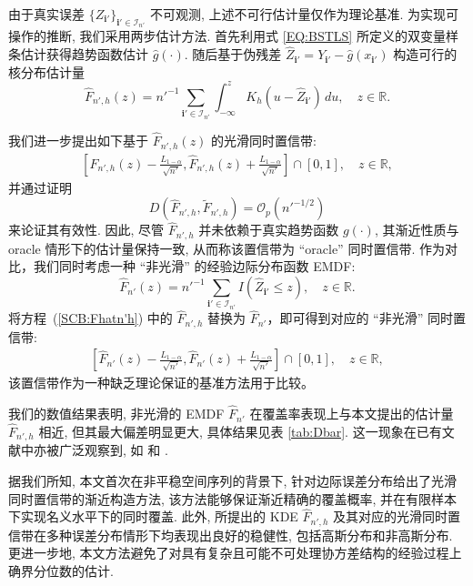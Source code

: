 \documentclass[a4paper,openay,14pt]{ctexbook}
\numberwithin{equation}{section}
\numberwithin{lem}{section}
\begin{document}
由于真实误差 $\{Z_{\mathbf{i}'}\}_{\mathbf{i}' \in \mathcal{I}_{n'}}$ 不可观测, 上述不可行估计量仅作为理论基准. 为实现可操作的推断, 我们采用两步估计方法. 首先利用式 \eqref{EQ:BSTLS} 所定义的双变量样条估计获得趋势函数估计 $\hat{g}(\cdot)$. 随后基于伪残差
$\hat{Z}_{\mathbf{i}'} = Y_{\mathbf{i}'} - \hat{g}(x_{\mathbf{i}'})$
构造可行的核分布估计量
\begin{equation}\label{EQ:Fn'hhat}
\hat{F}_{n',h}(z)
= n'^{-1} \sum_{\mathbf{i}' \in \mathcal{I}_{n'}}
\int_{-\infty}^{z} K_h(u - \hat{Z}_{\mathbf{i}'}) \, du,
\quad z \in \mathbb{R}.
\end{equation}

我们进一步提出如下基于 $\hat{F}_{n',h}(z)$ 的光滑同时置信带:
\begin{align}\label{SCB:Fhatn'h}
\left[
\hat{F}_{n',h}(z) - \frac{L_{1-\alpha}}{\sqrt{n'}},
\hat{F}_{n',h}(z) + \frac{L_{1-\alpha}}{\sqrt{n'}}
\right] \cap [0,1], 
\quad z \in \mathbb{R},
\end{align}
并通过证明
\[
D\left(\hat{F}_{n',h}, \tilde{F}_{n',h}\right)
= \mathcal{O}_p(n'^{-1/2})
\]
来论证其有效性. 因此, 尽管 $\hat{F}_{n',h}$ 并未依赖于真实趋势函数 $g(\cdot)$, 其渐近性质与 oracle 情形下的估计量保持一致, 从而称该置信带为 ``oracle'' 同时置信带.
作为对比，我们同时考虑一种 ``非光滑'' 的经验边际分布函数 EMDF:
\begin{equation} \label{EQ:Fn'hat}
    \hat{F}_{n'}(z) = n'^{-1}\sum_{\mathbf{i}'\in\mathcal{I}_{n'}} I(\hat{Z}_{\mathbf{i}'} \le z), \quad z \in \mathbb{R}.
\end{equation}
将方程~(\ref{SCB:Fhatn'h}) 中的 $\hat{F}_{n',h}$ 替换为 $\hat{F}_{n'}$，即可得到对应的 ``非光滑'' 同时置信带:
\begin{align} \label{SCB:Fhatn'}
    \left[ \hat{F}_{n'}(z) - \frac{L_{1-\alpha}}{\sqrt{n'}},  \hat{F}_{n'}(z) + \frac{L_{1-\alpha}}{\sqrt{n'}} \right] \cap [0,1], \quad z \in \mathbb{R},
\end{align}
该置信带作为一种缺乏理论保证的基准方法用于比较。

我们的数值结果表明, 非光滑的 EMDF $\hat{F}_{n'}$ 在覆盖率表现上与本文提出的估计量 $\hat{F}_{n',h}$ 相近, 但其最大偏差明显更大, 具体结果见表 \ref{tab:Dbar}. 这一现象在已有文献中亦被广泛观察到, 如 \cite{gu2021smooth} 和 \cite{wang2022oracle}.

据我们所知, 本文首次在非平稳空间序列的背景下, 针对边际误差分布给出了光滑同时置信带的渐近构造方法, 该方法能够保证渐近精确的覆盖概率, 并在有限样本下实现名义水平下的同时覆盖. 此外, 所提出的 KDE $\hat{F}_{n',h}$ 及其对应的光滑同时置信带在多种误差分布情形下均表现出良好的稳健性, 包括高斯分布和非高斯分布. 更进一步地, 本文方法避免了对具有复杂且可能不可处理协方差结构的经验过程上确界分位数的估计.
\end{document}
